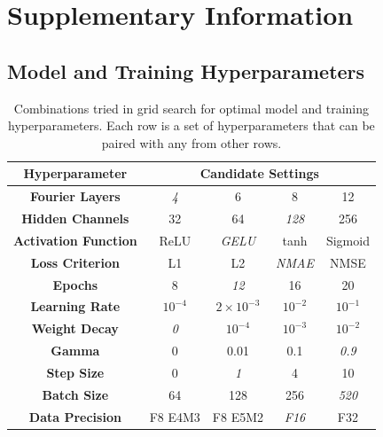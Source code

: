 \documentclass[preprint,review,12pt,numafflabel]{elsarticle}
\begin{document}

% 


\clearpage
\appendix

\renewcommand{\thesection}{S\arabic{section}}
\renewcommand{\thesubsection}{S\arabic{section}.\arabic{subsection}}
\renewcommand{\thefigure}{S\arabic{figure}}
\renewcommand{\thetable}{S\arabic{table}}
\renewcommand{\theequation}{S\arabic{equation}}

\setcounter{figure}{0}
\setcounter{table}{0}
\setcounter{equation}{0}

\section{Supplementary Information}
\label{sec:supplement}
\subsection{Model and Training Hyperparameters}
\begin{table}[H]
    \centering
    \begin{tabular}{|c|c|c|c|c|}
        \hline
        \textbf{Hyperparameter} &
        \multicolumn{4}{c|}{\textbf{Candidate Settings}} \\ \hline
    
        \textbf{Fourier Layers} & \textit{4} & 6 & 8 & 12 \\ \hline
        \textbf{Hidden Channels} & 32 & 64 & \textit{128} & 256 \\ \hline
        \textbf{Activation Function} & ReLU & \textit{GELU} & tanh & Sigmoid \\ \hline
        \textbf{Loss Criterion} & L1 & L2 & \textit{NMAE} & NMSE \\ \hline
        \textbf{Epochs} & 8 & \textit{12} & 16 & 20 \\ \hline
        \textbf{Learning Rate} & $10^{-4}$ & \textit{$2\times10^{-3}$} & $10^{-2}$ & $10^{-1}$ \\ \hline
        \textbf{Weight Decay} & \textit{0} & $10^{-4}$ & $10^{-3}$ & $10^{-2}$ \\ \hline
        \textbf{Gamma} & 0 & 0.01 & 0.1 & \textit{0.9} \\ \hline
        \textbf{Step Size} & 0 & \textit{1} & 4 & 10 \\ \hline
        \textbf{Batch Size} & 64 & 128 & 256 & \textit{520} \\ \hline
        \textbf{Data Precision} & F8 E4M3 & F8 E5M2 & \textit{F16} & F32 \\ \hline
    \end{tabular}
    \caption{Combinations tried in grid search for optimal model and training hyperparameters. Each row is a set of hyperparameters that can be paired with any from other rows.}
    \label{tab:training_hyperparameters}
\end{table}
\end{document}
